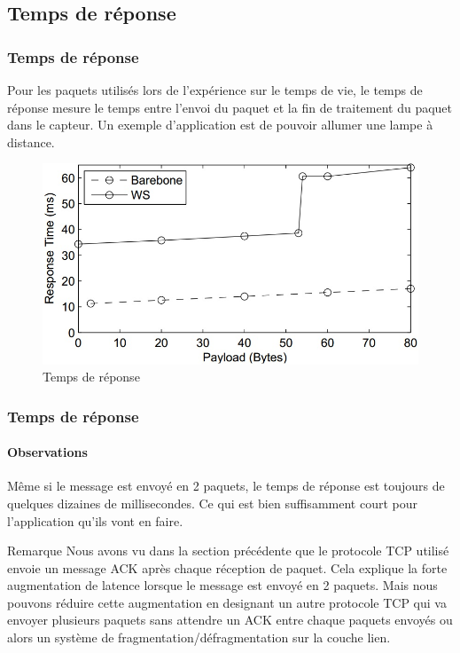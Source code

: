 \subsection{Temps de réponse}
\begin{frame}
 \frametitle{Temps de réponse}
 Pour les paquets utilisés lors de l'expérience sur le temps de vie, le temps de réponse mesure le temps entre l'envoi du paquet et la fin de traitement du paquet dans le capteur.
 Un exemple d'application est de pouvoir allumer une lampe à distance.
 \begin{figure}
  \centering
  \includegraphics[scale=0.35]{figures/treponse.jpg}
  \caption{Temps de réponse}
 \end{figure} 
\end{frame}
 
\begin{frame}
 \frametitle{Temps de réponse}
 \framesubtitle{Observations}
 Même si le message est envoyé en 2 paquets, le temps de réponse est toujours de quelques dizaines de millisecondes.
 Ce qui est bien suffisamment court pour l'application qu'ils vont en faire.\\
 \begin{block}{Remarque}
 Nous avons vu dans la section précédente que le protocole TCP utilisé envoie un message ACK après chaque réception de paquet.
 Cela explique la forte augmentation de latence lorsque le message est envoyé en 2 paquets.
 Mais nous pouvons réduire cette augmentation en designant un autre protocole TCP qui va envoyer plusieurs paquets sans attendre un ACK entre chaque paquets envoyés ou alors un système de fragmentation/défragmentation sur la couche lien.
 \end{block}
\end{frame}